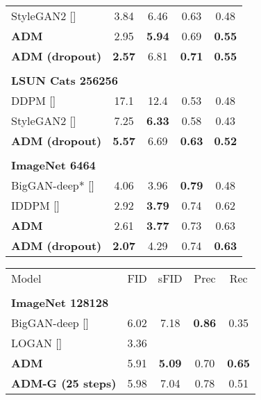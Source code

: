 \documentclass{article}
\newcommand{\shortcite}[1]{[\citenum{#1}]}
\newcommand{\ablaname}{ADM}
\newcommand{\guidedname}{ADM-G}
\begin{document}
\begin{table}[t]
\begin{center}
\begin{small}
\begin{subtable}[t]{.5\linewidth}
\begin{tabular}[t]{lcccc}
    StyleGAN2 \shortcite{stylegan2}        & 3.84          & 6.46      &  0.63      & 0.48 \\
    \bf{\ablaname{}}             & 2.95          & \bf{5.94} &  0.69      & \bf{0.55} \\
    \bf{\ablaname{} (dropout)}   & \bf{2.57}     & 6.81 &  \bf{0.71}  & \bf{0.55} \\
    \\
    \multicolumn{5}{l}{\bf{LSUN Cats} 256256} \\
    \toprule
    DDPM \shortcite{ddpm} & 17.1 & 12.4 & 0.53 & 0.48 \\
    StyleGAN2 \shortcite{stylegan2}        & 7.25          & \bf{6.33} &  0.58      & 0.43  \\
    \bf{\ablaname{} (dropout)}   & \bf{5.57}     & 6.69      &  \bf{0.63}  & \bf{0.52}  \\
    \\
    \multicolumn{5}{l}{\bf{ImageNet} 6464} \\
    \toprule
    BigGAN-deep* \shortcite{biggan}     & 4.06         & 3.96      & \bf{0.79} & 0.48  \\
    IDDPM \shortcite{improved}   & 2.92         & \bf{3.79} & 0.74      & 0.62 \\
    \bf{\ablaname{}}             & 2.61         & \bf{3.77} & 0.73      & 0.63  \\
    \bf{\ablaname{} (dropout)}   & \bf{2.07}    & 4.29      & 0.74      & \bf{0.63}  \\     
    \end{tabular}
    \end{subtable}\begin{subtable}[t]{.5\linewidth}
    \begin{tabular}[t]{lcccc}
    \toprule
    Model            & FID          & sFID       & Prec & Rec \\
    \\
    \multicolumn{5}{l}{\bf{ImageNet} 128128} \\
    \toprule
    BigGAN-deep \shortcite{biggan}              & 6.02          & 7.18          & \bf{0.86}     & 0.35          \\
    LOGAN \shortcite{logan}  & 3.36          &               &               &               \\
    \bf{\ablaname{}}                     & 5.91          & \bf{5.09}     & 0.70          & \bf{0.65}     \\
    \bf{\guidedname{} (25 steps)}      & 5.98          & 7.04          & 0.78          & 0.51          \\

\end{tabular}
\end{subtable}
\end{small}
\end{center}
\end{table}
\end{document}
